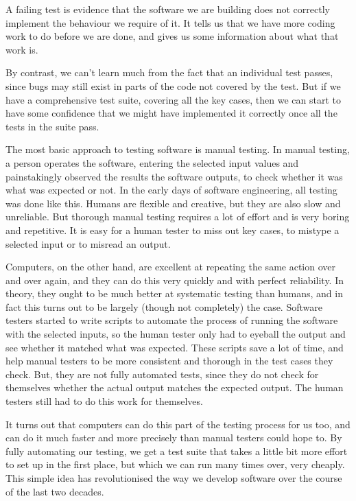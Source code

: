 \documentclass[
]{book}
\begin{document}
A failing test is evidence that the software we are building does not correctly implement the behaviour we require of it. It tells us that we have more coding work to do before we are done, and gives us some information about what that work is.

By contrast, we can't learn much from the fact that an individual test passes, since bugs may still exist in parts of the code not covered by the test. But if we have a comprehensive test suite, covering all the key cases, then we can start to have some confidence that we might have implemented it correctly once all the tests in the suite pass.

The most basic approach to testing software is manual testing. In manual testing, a person operates the software, entering the selected input values and painstakingly observed the results the software outputs, to check whether it was what was expected or not. In the early days of software engineering, all testing was done like this. Humans are flexible and creative, but they are also slow and unreliable. But thorough manual testing requires a lot of effort and is very boring and repetitive. It is easy for a human tester to miss out key cases, to mistype a selected input or to misread an output.

Computers, on the other hand, are excellent at repeating the same action over and over again, and they can do this very quickly and with perfect reliability. In theory, they ought to be much better at systematic testing than humans, and in fact this turns out to be largely (though not completely) the case. Software testers started to write scripts to automate the process of running the software with the selected inputs, so the human tester only had to eyeball the output and see whether it matched what was expected. These scripts save a lot of time, and help manual testers to be more consistent and thorough in the test cases they check. But, they are not fully automated tests, since they do not check for themselves whether the actual output matches the expected output. The human testers still had to do this work for themselves.

It turns out that computers can do this part of the testing process for us too, and can do it much faster and more precisely than manual testers could hope to. By fully automating our testing, we get a test suite that takes a little bit more effort to set up in the first place, but which we can run many times over, very cheaply. This simple idea has revolutionised the way we develop software over the course of the last two decades.
\end{document}
